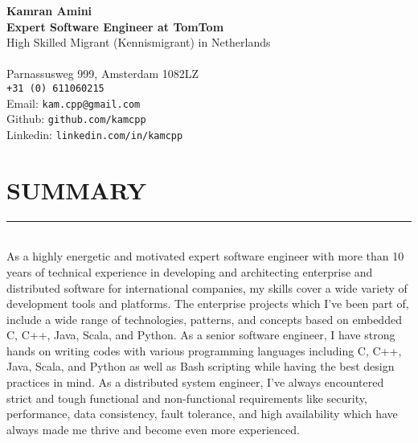 \documentclass[10pt,a4paper]{article}
\begin{document}
\noindent \textbf{Kamran Amini} \\
\noindent \small \textbf{Expert Software Engineer at TomTom} \\
\noindent \small High Skilled Migrant (Kennismigrant) in Netherlands \\ \\
Parnassusweg 999, Amsterdam 1082LZ \\
\texttt{+31 (0) 611060215} \\
Email: \texttt{kam.cpp@gmail.com} \\
Github: \texttt{github.com/kamcpp} \\
Linkedin: \texttt{linkedin.com/in/kamcpp} 

\section{SUMMARY}
\noindent \rule {18.0cm}{0.2pt} \\
\small As a highly energetic and motivated expert software engineer with more than 10 years of technical experience in developing and architecting enterprise and distributed software for international companies, my skills cover a wide variety of development tools and platforms. The enterprise projects which I've been part of, include a wide range of technologies, patterns, and concepts based on embedded C, C++, Java, Scala, and Python. As a senior software engineer, I have strong hands on writing codes with various programming languages including C, C++, Java, Scala, and Python as well as Bash scripting while having the best design practices in mind. As a distributed system engineer, I've always encountered strict and tough functional and non-functional requirements like security, performance, data consistency, fault tolerance, and high availability which have always made me thrive and become even more experienced.

\small
\end{document}
